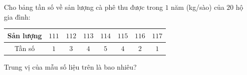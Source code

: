 \begin{ex}
Cho bảng tần số về sản lượng cà phê thu được trong $1$ năm (kg/sào) của $20$ hộ gia đình:
\begin{center}
\begin{tabular}{|c|c|c|c|c|c|c|c|}\hline
Sản lượng & $111$ & $112$ & $113$ & $114$ & $115$ & $116$ & $117$\\\hline
Tần số & $1$ & $3$ & $4$ & $5$ & $4$ & $2$ & $1$\\\hline
\end{tabular}
\end{center}
Trung vị của mẫu số liệu trên là bao nhiêu?
\end{ex}
